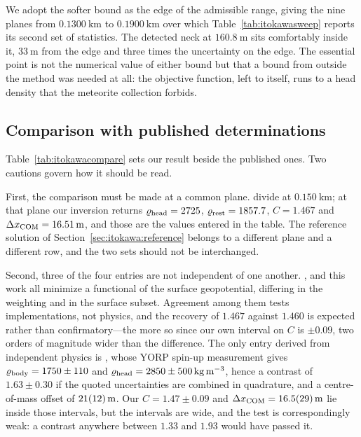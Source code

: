 We adopt the softer bound as the edge of the admissible range, giving the
nine planes from $\SI{0.1300}{\kilo\metre}$ to
$\SI{0.1900}{\kilo\metre}$ over which Table~\ref{tab:itokawasweep}
reports its second set of statistics. The detected neck at
$\SI{160.8}{\metre}$ sits comfortably inside it, $\SI{33}{\metre}$ from
the edge and three times the uncertainty on the edge. The essential point
is not the numerical value of either bound but that a bound from outside
the method was needed at all: the objective function, left to itself,
runs to a head density that the meteorite collection forbids.

\subsection{Comparison with published determinations}
\label{sec:itokawa:comparison}

Table~\ref{tab:itokawacompare} sets our result beside the published ones.
Two cautions govern how it should be read.

First, the comparison must be made at a common plane.
\citet{kanamaru2019} divide at $\SI{0.150}{\kilo\metre}$; at that plane
our inversion returns $\varrho_{\mathrm{head}} = 2725$, $\varrho_{\mathrm{rest}} = 1857.7$,
$C = 1.467$ and $\Delta x_{\mathrm{COM}} = \SI{16.51}{\metre}$, and those are the values
entered in the table. The reference solution of
Section~\ref{sec:itokawa:reference} belongs to a different plane and a
different row, and the two sets should not be interchanged.

Second, three of the four entries are not independent of one another.
\citet{motooka2012}, \citet{kanamaru2019} and this work all minimize a
functional of the surface geopotential, differing in the weighting and in
the surface subset. Agreement among them tests implementations, not
physics, and the recovery of $1.467$ against $1.460$ is expected rather
than confirmatory---the more so since our own interval on $C$ is
$\pm0.09$, two orders of magnitude wider than the difference. The only
entry derived from independent physics is \citet{lowry2014}, whose YORP
spin-up measurement gives $\varrho_{\mathrm{body}} = 1750 \pm 110$ and
$\varrho_{\mathrm{head}} = 2850 \pm \SI{500}{\kilo\gram\per\cubic\metre}$, hence a
contrast of $1.63 \pm 0.30$ if the quoted uncertainties are combined in
quadrature, and a centre-of-mass offset of $\SI{21+-12}{\metre}$. Our
$C = 1.47 \pm 0.09$ and $\Delta x_{\mathrm{COM}} = \SI{16.5+-2.9}{\metre}$ lie inside those
intervals, but the intervals are wide, and the test is correspondingly
weak: a contrast anywhere between $1.33$ and $1.93$ would have passed it.

